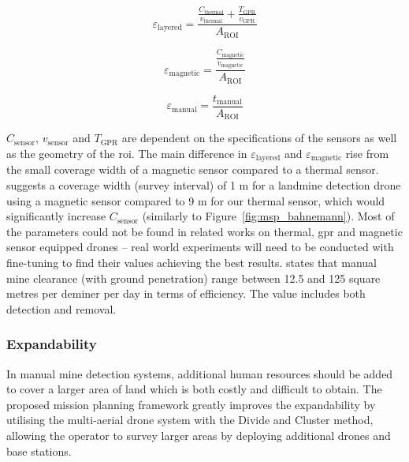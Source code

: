 \begin{equation}
\label{eq:msp_layeredefficiency}
\varepsilon_{\mathrm{layered}} = \frac{\frac{C_{\mathrm{thermal}}}{v_{\mathrm{thermal}}}+\frac{T_{\mathrm{GPR}}}{v_{\mathrm{GPR}}}}{A_{\mathrm{ROI}}}
\end{equation}

\begin{equation}
\label{eq:msp_magneticefficiency}
\varepsilon_{\mathrm{magnetic}} = \frac{\frac{C_{\mathrm{magnetic}}}{v_{\mathrm{magnetic}}}}{A_{\mathrm{ROI}}}
\end{equation}

\begin{equation}
\label{eq:msp_manualefficiency}
\varepsilon_{\mathrm{manual}} = \frac{t_{\mathrm{manual}}}{A_{\mathrm{ROI}}}
\end{equation}

$C_{\mathrm{sensor}}$, $v_{\mathrm{sensor}}$ and $T_{\mathrm{GPR}}$ are dependent on the specifications of the sensors as well as the geometry of the \gls{roi}. The main difference in $\varepsilon_{\mathrm{layered}}$ and $\varepsilon_{\mathrm{magnetic}}$ rise from the small coverage width of a magnetic sensor compared to a thermal sensor. \cite{Yoo2024UnmannedAV} suggests a coverage width (survey interval) of 1 m for a landmine detection drone using a magnetic sensor compared to 9 m for our thermal sensor, which would significantly increase $C_{\mathrm{sensor}}$ (similarly to Figure~\ref{fig:msp_bahnemann}). Most of the parameters could not be found in related works on thermal, \gls{gpr} and magnetic sensor equipped drones -- real world experiments will need to be conducted with fine-tuning to find their values achieving the best results. \cite{gichd2005manual} states that manual mine clearance (with ground penetration) range between 12.5 and 125 square metres per deminer per day in terms of efficiency. The value includes both detection and removal. 

\subsubsection{Expandability}

In manual mine detection systems, additional human resources should be added to cover a larger area of land which is both costly and difficult to obtain. The proposed mission planning framework greatly improves the expandability by utilising the multi-aerial drone system with the Divide and Cluster method, allowing the operator to survey larger areas by deploying additional drones and base stations. 

